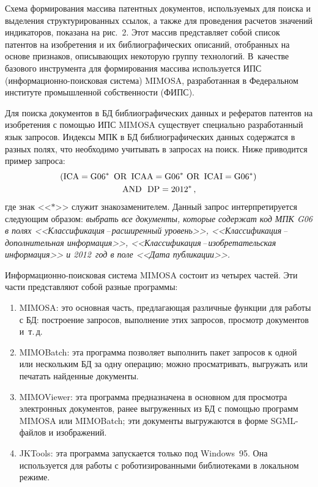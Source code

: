 \begin{multicols}{2}
      Схема формирования массива патентных документов, используемых для поиска и 
выделения структурированных ссылок, а также для проведения расчетов значений индикаторов, 
показана на рис.~2. Этот массив представляет собой список патентов на изобретения и их 
библиографических описаний, отобранных на основе признаков, описывающих некоторую 
группу технологий. В~качестве базового инструмента для формирования массива используется 
ИПС (ин\-фор\-ма\-ци\-он\-но-по\-иско\-вая система) MIMOSA, разработанная в Федеральном 
институте промышленной собственности (ФИПС).


      
      Для поиска документов в БД библиографических данных и рефератов патентов на 
изобретения с помощью ИПС MIMOSA существует специально разработанный язык запросов. 
Индексы МПК в БД библиографических данных содержатся в разных полях, что необходимо 
учитывать в запросах на поиск. Ниже приводится пример запроса:
      \begin{multline*}
\hspace*{-2pt}(\mathrm{ICA=G06^*}\ \, \mathrm{OR}\ \, \mathrm{ICAA=G06}^*\  \mathrm{OR}\ \,
\mathrm{ICAI=G06^*})\\  \mbox{AND}\ \ \mathrm{DP=2012^*}\,,
\end{multline*} 
      где знак <<$*$>> служит знакозаменителем. Данный запрос интерпретируется 
следующим образом: \textit{выбрать все документы, которые содержат код МПК G06 в полях 
<<Клас\-си\-фи\-ка\-ция\,--\,рас\-ши\-рен\-ный уровень>>, 
      <<Клас\-си\-фи\-ка\-ция\,--\,до\-пол\-ни\-тель\-ная информация>>, 
      <<Клас\-си\-фи\-ка\-ция\,--\,изобре\-та\-тель\-ская информация>> и 2012~год в поле 
<<Дата публикации>>.}
      
      Информационно-поисковая сис\-те\-ма MIMOSA состоит из четырех частей. Эти части представляют собой разные 
программы:
      \begin{enumerate}[(1)]
\item MIMOSA: это основная часть, предлагающая различные функции для работы с 
БД: по\-стро\-ение запросов, выполнение этих запросов, просмотр документов 
и~т.\,д.
\item MIMOBatch: эта программа позволяет выполнить пакет запросов к одной или 
нескольким БД за одну операцию; можно просматривать, выгружать или 
печатать найденные документы.
\item MIMOViewer: эта программа предназначена в основном для просмотра электронных 
документов, ранее выгруженных из БД с помощью программ MIMOSA или 
MIMOBatch; эти документы выгружаются в форме SGML-фай\-лов и изображений.
\item JKTools: эта программа запускается только под Windows~95. Она используется для 
работы с роботизированными библиотеками в локальном режиме.
      \end{enumerate}
      

\end{multicols}
